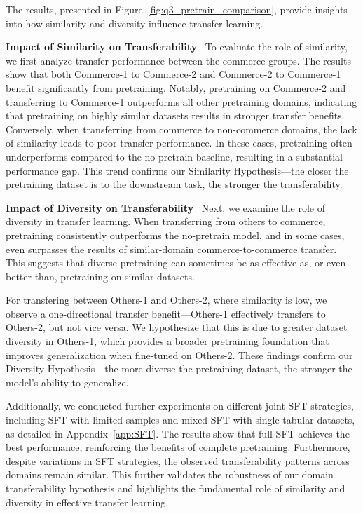 \documentclass{article}
\theoremstyle{plain}
\theoremstyle{definition}
\theoremstyle{remark}
\begin{document}
The results, presented in Figure~\ref{fig:q3_pretrain_comparison}, provide insights into how similarity and diversity influence transfer learning.

\textbf{Impact of Similarity on Transferability}~
To evaluate the role of similarity, we first analyze transfer performance between the commerce groups. The results show that both Commerce-1 to Commerce-2 and Commerce-2 to Commerce-1 benefit significantly from pretraining. Notably, pretraining on Commerce-2 and transferring to Commerce-1 outperforms all other pretraining domains, indicating that pretraining on highly similar datasets results in stronger transfer benefits. Conversely, when transferring from commerce to non-commerce domains, the lack of similarity leads to poor transfer performance. In these cases, pretraining often underperforms compared to the no-pretrain baseline, resulting in a substantial performance gap. This trend confirms our Similarity Hypothesis—the closer the pretraining dataset is to the downstream task, the stronger the transferability.

\textbf{Impact of Diversity on Transferability}~
Next, we examine the role of diversity in transfer learning. When transferring from others to commerce, pretraining consistently outperforms the no-pretrain model, and in some cases, even surpasses the results of similar-domain commerce-to-commerce transfer. This suggests that diverse pretraining can sometimes be as effective as, or even better than, pretraining on similar datasets.

For transfering between Others-1 and Others-2, where similarity is low, we observe a one-directional transfer benefit—Others-1 effectively transfers to Others-2, but not vice versa. We hypothesize that this is due to greater dataset diversity in Others-1, which provides a broader pretraining foundation that improves generalization when fine-tuned on Others-2. These findings confirm our Diversity Hypothesis—the more diverse the pretraining dataset, the stronger the model’s ability to generalize.

Additionally, we conducted further experiments on different joint SFT strategies, including SFT with limited samples and mixed SFT with single-tabular datasets, as detailed in Appendix~\ref{app:SFT}. The results show that full SFT achieves the best performance, reinforcing the benefits of complete pretraining. Furthermore, despite variations in SFT strategies, the observed transferability patterns across domains remain similar. This further validates the robustness of our domain transferability hypothesis and highlights the fundamental role of similarity and diversity in effective transfer learning.
\end{document}
